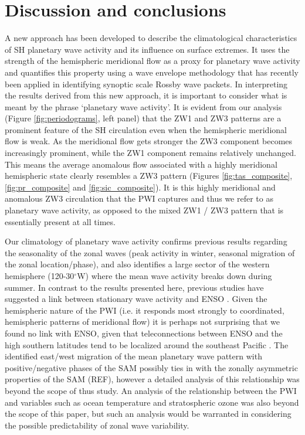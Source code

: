 \section{Discussion and conclusions}

A new approach has been developed to describe the climatological characteristics of SH planetary wave activity and its influence on surface extremes. It uses the strength of the hemispheric meridional flow as a proxy for planetary wave activity and quantifies this property using a wave envelope methodology that has recently been applied in identifying synoptic scale Rossby wave packets. In interpreting the results derived from this new approach, it is important to consider what is meant by the phrase `planetary wave activity'. It is evident from our analysis (Figure \ref{fig:periodograms}, left panel) that the ZW1 and ZW3 patterns are a prominent feature of the SH circulation even when the hemispheric meridional flow is weak. As the meridional flow gets stronger the ZW3 component becomes increasingly prominent, while the ZW1 component remains relatively unchanged. This means the average anomalous flow associated with a highly meridional hemispheric state clearly resembles a ZW3 pattern (Figures \ref{fig:tas_composite}, \ref{fig:pr_composite} and \ref{fig:sic_composite}). It is this highly meridional and anomalous ZW3 circulation that the PWI captures and thus we refer to as planetary wave activity, as opposed to the mixed ZW1 / ZW3 pattern that is essentially present at all times.  

Our climatology of planetary wave activity confirms previous results regarding the seasonality of the zonal waves (peak activity in winter, seasonal migration of the zonal location/phase), and also identifies a large sector of the western hemisphere (120-30$^{\circ}$W) where the mean wave activity breaks down during summer. In contrast to the results presented here, previous studies have suggested a link between stationary wave activity and ENSO \citep[e.g.][]{Trenberth1980,Raphael2003,Hobbs2007}. Given the hemispheric nature of the PWI (i.e. it responds most strongly to coordinated, hemispheric patterns of meridional flow) it is perhaps not surprising that we found no link with ENSO, given that teleconnections between ENSO and the high southern latitudes tend to be localized around the southeast Pacific \citep{Turner2004}. The identified east/west migration of the mean planetary wave pattern with positive/negative phases of the SAM possibly ties in with the zonally asymmetric properties of the SAM (REF), however a detailed analysis of this relationship was beyond the scope of thus study. An analysis of the relationship between the PWI and variables such as ocean temperature and stratospheric ozone was also beyond the scope of this paper, but such an analysis would be warranted in considering the possible predictability of zonal wave variability.


